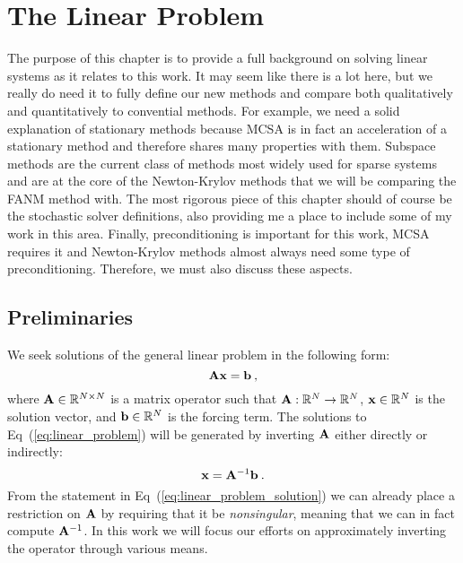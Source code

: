 \chapter{The Linear Problem}
\label{ch:linear_problem}

The purpose of this chapter is to provide a full background on solving
linear systems as it relates to this work. It may seem like there is a
lot here, but we really do need it to fully define our new methods and
compare both qualitatively and quantitatively to convential
methods. For example, we need a solid explanation of stationary
methods because MCSA is in fact an acceleration of a stationary method
and therefore shares many properties with them. Subspace methods are
the current class of methods most widely used for sparse systems and
are at the core of the Newton-Krylov methods that we will be comparing
the FANM method with. The most rigorous piece of this chapter should
of course be the stochastic solver definitions, also providing me a
place to include some of my work in this area. Finally,
preconditioning is important for this work, MCSA requires it and
Newton-Krylov methods almost always need some type of
preconditioning. Therefore, we must also discuss these aspects.

\section{Preliminaries}
\label{sec:linear_system}

We seek solutions of the general linear problem in the following form:
\begin{equation}
  \mathbf{A} \mathbf{x} = \mathbf{b}\:,
  \label{eq:linear_problem}
\end{equation}
where $\mathbf{A} \in \mathbb{R}^{N \times N}$ is a matrix operator such
that $\mathbf{A} : \mathbb{R}^{N} \rightarrow \mathbb{R}^{N}$, $\mathbf{x} \in
\mathbb{R}^N$ is the solution vector, and $\mathbf{b} \in \mathbb{R}^N$ is
the forcing term. The solutions to Eq~(\ref{eq:linear_problem}) will
be generated by inverting $\mathbf{A}$ either directly or indirectly:
\begin{equation}
  \mathbf{x} = \mathbf{A}^{-1} \mathbf{b}
  \label{eq:linear_problem_solution}\:.
\end{equation}
From the statement in Eq~(\ref{eq:linear_problem_solution}) we can
already place a restriction on $\mathbf{A}$ by requiring that it be
\textit{nonsingular}, meaning that we can in fact compute
$\mathbf{A}^{-1}$. In this work we will focus our efforts on approximately
inverting the operator through various means.

